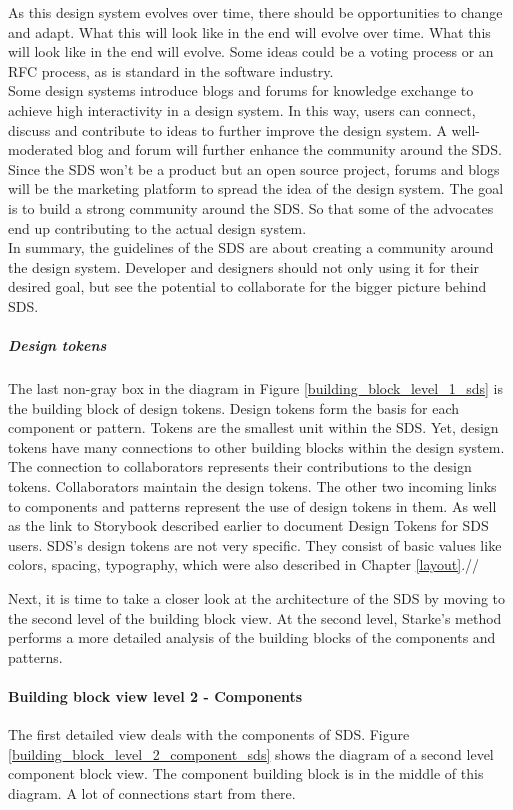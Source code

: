 As this design system evolves over time, there should be opportunities to change and adapt. What this will look like in the end will evolve over time. What this will look like in the end will evolve. Some ideas could be a voting process or an RFC process, as is standard in the software industry. \\
Some design systems introduce blogs and forums for knowledge exchange to achieve high interactivity in a design system. In this way, users can connect, discuss and contribute to ideas to further improve the design system. A well-moderated blog and forum will further enhance the community around the \ac{SDS}. \\
Since the \ac{SDS} won't be a product but an open source project, forums and blogs will be the marketing platform to spread the idea of the design system. The goal is to build a strong community around the \ac{SDS}. So that some of the advocates end up contributing to the actual design system. \\
In summary, the guidelines of the \acl{SDS} are about creating a community around the design system. Developer and designers should not only using it for their desired goal, but see the potential to collaborate for the bigger picture behind \ac{SDS}.

\subparagraph{Design tokens}
The last non-gray box in the diagram in Figure \ref{building_block_level_1_sds} is the building block of design tokens. Design tokens form the basis for each component or pattern. Tokens are the smallest unit within the \ac{SDS}. Yet, design tokens have many connections to other building blocks within the design system. 
The connection to collaborators represents their contributions to the design tokens. Collaborators maintain the design tokens. The other two incoming links to components and patterns represent the use of design tokens in them. As well as the link to Storybook described earlier to document Design Tokens for \ac{SDS} users.
\ac{SDS}'s design tokens are not very specific. They consist of basic values like colors, spacing, typography, which were also described in Chapter \ref{layout}.//

Next, it is time to take a closer look at the architecture of the SDS by moving to the second level of the building block view. At the second level, Starke's method performs a more detailed analysis of the building blocks of the components and patterns.

\paragraph{Building block view level 2 - Components}
The first detailed view deals with the components of SDS. Figure \ref{building_block_level_2_component_sds} shows the diagram of a second level component block view. The component building block is in the middle of this diagram. A lot of connections start from there.

